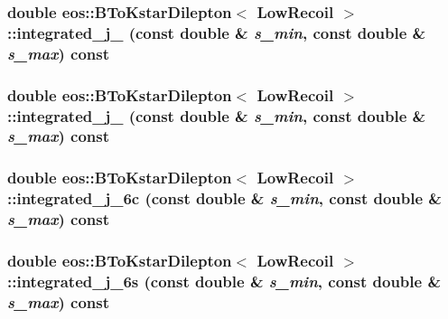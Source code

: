 \label{classeos_1_1BToKstarDilepton_3_01LowRecoil_01_4_a042d95c0b797000c2214bb41a7253d4d}
\hypertarget{classeos_1_1BToKstarDilepton_3_01LowRecoil_01_4_a2b22b8cc8d7a2546ea18ff056a2e8ca2}{
\subsubsection[{integrated\_\-j\_\-4}]{\setlength{\rightskip}{0pt plus 5cm}double eos::BToKstarDilepton$<$ {\bf LowRecoil} $>$::integrated\_\-j\_ (const double \& {\em s\_\-min}, \/  const double \& {\em s\_\-max}) const}}
\label{classeos_1_1BToKstarDilepton_3_01LowRecoil_01_4_a2b22b8cc8d7a2546ea18ff056a2e8ca2}
\hypertarget{classeos_1_1BToKstarDilepton_3_01LowRecoil_01_4_af7e6c518a032eccad0f96a766216e55f}{
\subsubsection[{integrated\_\-j\_\-5}]{\setlength{\rightskip}{0pt plus 5cm}double eos::BToKstarDilepton$<$ {\bf LowRecoil} $>$::integrated\_\-j\_ (const double \& {\em s\_\-min}, \/  const double \& {\em s\_\-max}) const}}
\label{classeos_1_1BToKstarDilepton_3_01LowRecoil_01_4_af7e6c518a032eccad0f96a766216e55f}
\hypertarget{classeos_1_1BToKstarDilepton_3_01LowRecoil_01_4_a058b5fc3819fa4db3670a5c6bce2c950}{
\subsubsection[{integrated\_\-j\_\-6c}]{\setlength{\rightskip}{0pt plus 5cm}double eos::BToKstarDilepton$<$ {\bf LowRecoil} $>$::integrated\_\-j\_\-6c (const double \& {\em s\_\-min}, \/  const double \& {\em s\_\-max}) const}}
\label{classeos_1_1BToKstarDilepton_3_01LowRecoil_01_4_a058b5fc3819fa4db3670a5c6bce2c950}
\hypertarget{classeos_1_1BToKstarDilepton_3_01LowRecoil_01_4_a1c86b7c7225aea0d22cebf316234b031}{
\subsubsection[{integrated\_\-j\_\-6s}]{\setlength{\rightskip}{0pt plus 5cm}double eos::BToKstarDilepton$<$ {\bf LowRecoil} $>$::integrated\_\-j\_\-6s (const double \& {\em s\_\-min}, \/  const double \& {\em s\_\-max}) const}}
